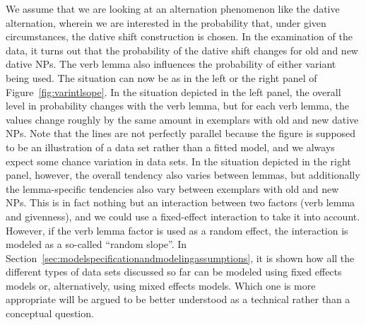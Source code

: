 We assume that we are looking at an alternation phenomenon like the dative alternation, wherein we are interested in the probability that, under given circumstances, the dative shift construction is chosen.
In the examination of the data, it turns out that the probability of the dative shift changes for old and new dative NPs.
The verb lemma also influences the probability of either variant being used.
The situation can now be as in the left or the right panel of Figure~\ref{fig:varintlsope}.
In the situation depicted in the left panel, the overall level in probability changes with the verb lemma, but for each verb lemma, the values change roughly by the same amount in exemplars with old and new dative NPs.
Note that the lines are not perfectly parallel because the figure is supposed to be an illustration of a data set rather than a fitted model, and we always expect some chance variation in data sets.
In the situation depicted in the right panel, however, the overall tendency also varies between lemmas, but additionally the lemma-specific tendencies also vary between exemplars with old and new NPs.
This is in fact nothing but an interaction between two factors (verb lemma and givenness), and we could use a fixed-effect interaction to take it into account.
However, if the verb lemma factor is used as a random effect, the interaction is modeled as a so-called ``random slope''.
In Section~\ref{sec:modelspecificationandmodelingassumptions}, it is shown how all the different types of data sets discussed so far can be modeled using fixed effects models or, alternatively, using mixed effects models.
Which one is more appropriate will be argued to be better understood as a technical rather than a conceptual question.

